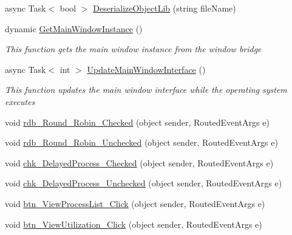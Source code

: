 \begin{DoxyCompactItemize}
async Task$<$ bool $>$ \hyperlink{class_c_p_u___o_s___simulator_1_1_operating_system_main_window_a101a9eba4d603045fd4539eb28e0f4b1}{Deserialize\+Object\+Lib} (string file\+Name)
\item 
dynamic \hyperlink{class_c_p_u___o_s___simulator_1_1_operating_system_main_window_a8d21cdb52091b9568f14f7e66b7422ca}{Get\+Main\+Window\+Instance} ()
\begin{DoxyCompactList}\small\item\em This function gets the main window instance from the window bridge \end{DoxyCompactList}\item 
async Task$<$ int $>$ \hyperlink{class_c_p_u___o_s___simulator_1_1_operating_system_main_window_a6ce2ed7107086d825854da88e20508ed}{Update\+Main\+Window\+Interface} ()
\begin{DoxyCompactList}\small\item\em This function updates the main window interface while the operating system executes \end{DoxyCompactList}\item 
void \hyperlink{class_c_p_u___o_s___simulator_1_1_operating_system_main_window_a3bc41466bb59866b4157310c9f6aa7a6}{rdb\+\_\+\+Round\+\_\+\+Robin\+\_\+\+Checked} (object sender, Routed\+Event\+Args e)
\item 
void \hyperlink{class_c_p_u___o_s___simulator_1_1_operating_system_main_window_aa51e30b2f3d96ef188b2237049c1fae0}{rdb\+\_\+\+Round\+\_\+\+Robin\+\_\+\+Unchecked} (object sender, Routed\+Event\+Args e)
\item 
void \hyperlink{class_c_p_u___o_s___simulator_1_1_operating_system_main_window_af5f4146e6a7a937a9951ab388710690f}{chk\+\_\+\+Delayed\+Process\+\_\+\+Checked} (object sender, Routed\+Event\+Args e)
\item 
void \hyperlink{class_c_p_u___o_s___simulator_1_1_operating_system_main_window_af44e2e2524c4d76e7af6d3e058fe594d}{chk\+\_\+\+Delayed\+Process\+\_\+\+Unchecked} (object sender, Routed\+Event\+Args e)
\item 
void \hyperlink{class_c_p_u___o_s___simulator_1_1_operating_system_main_window_a42980152348f9d1cee3fd0bb77346f65}{btn\+\_\+\+View\+Process\+List\+\_\+\+Click} (object sender, Routed\+Event\+Args e)
\item 
void \hyperlink{class_c_p_u___o_s___simulator_1_1_operating_system_main_window_a622ee248dca3a212f7f3486b11825f78}{btn\+\_\+\+View\+Utilization\+\_\+\+Click} (object sender, Routed\+Event\+Args e)
\end{DoxyCompactItemize}
